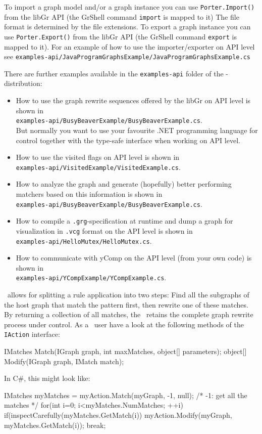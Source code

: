 To import a graph model and/or a graph instance you can use \texttt{Porter.Import()} from the libGr API (the GrShell command \texttt{import} is mapped to it)
The file format is determined by the file extensions.
To export a graph instance you can use \texttt{Porter.Export()} from the libGr API (the GrShell command \texttt{export} is mapped to it).
For an example of how to use the importer/exporter on API level see \texttt{examples-api/JavaProgramGraphsExample/JavaProgramGraphs\-Example.cs}

There are further examples available in the \texttt{examples-api} folder of the \GrG-distribution:
\begin{itemize} 
\item How to use the graph rewrite sequences offered by the libGr on API level is shown in\\
\texttt{examples-api/BusyBeaverExample/BusyBeaverExample.cs}.\\
But normally you want to use your favourite .NET programming language for control together with the type-safe interface when working on API level.
\item How to use the visited\label{apiallocvisitflag} flags on API level is shown in\\
\texttt{examples-api/VisitedExample/VisitedExample.cs}.
\item How to analyze the graph and generate (hopefully) better performing matchers based on this information is shown in\\
\texttt{examples-api/BusyBeaverExample/BusyBeaverExample.cs}.
\item How to compile a \texttt{.grg}-specification at runtime and dump a graph for visualization in \texttt{.vcg} format on the API level is shown in\\
\texttt{examples-api/HelloMutex/HelloMutex.cs}.
\item How to communicate with yComp on the API level (from your own code) is shown in\\
\texttt{examples-api/YCompExample/YCompExample.cs}.
\end{itemize}

\begin{note}
\LibGr\ allows for splitting a rule application into two steps:
Find all the subgraphs of the host graph that match the pattern first, then rewrite one of these matches. 
By returning a collection of all matches, the \LibGr\ retains the complete graph rewrite process under control.
As a \LibGr\ user have a look at the following methods of the \texttt{IAction} interface:
\begin{csharplet}
IMatches Match(IGraph graph, int maxMatches, object[] parameters);
object[] Modify(IGraph graph, IMatch match);
\end{csharplet}

In C\#, this might look like:
\begin{csharplet}
IMatches myMatches = myAction.Match(myGraph, -1, null); /* -1: get all the matches */
for(int i=0; i<myMatches.NumMatches; ++i)
{
	if(inspectCarefully(myMatches.GetMatch(i))
	{
		myAction.Modify(myGraph, myMatches.GetMatch(i));
		break;
  	}
}
\end{csharplet}
\end{note}

